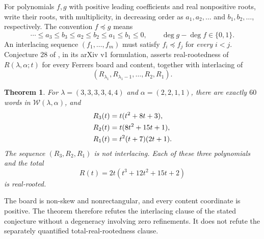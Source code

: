 \documentclass[11pt]{article}
\newtheorem{theorem}{Theorem}
\newcommand{\W}{\mathcal W}
\begin{document}
For polynomials $f,g$ with positive leading coefficients and real
nonpositive roots, write their roots, with multiplicity, in decreasing
order as $a_1,a_2,\ldots$ and $b_1,b_2,\ldots$, respectively.
The convention $f\preceq g$ means
\begin{equation}\label{eq:interlace}
 \cdots\leq a_3\leq b_3\leq a_2\leq b_2\leq a_1\leq b_1\leq0,
 \qquad \deg g-\deg f\in\{0,1\}.
\end{equation}
An interlacing sequence $(f_1,\ldots,f_m)$ must satisfy
$f_i\preceq f_j$ for \emph{every} $i<j$.
Conjecture 28 of \cite{AJQ2025}, in its arXiv v1 formulation, asserts
real-rootedness of $R(\lambda,\alpha;t)$ for every Ferrers board and content,
together with interlacing of
\begin{equation}\label{eq:conjectured}
 (R_{\lambda_1},R_{\lambda_1-1},\ldots,R_2,R_1).
\end{equation}

\begin{theorem}\label{thm:witness}
For $\lambda=(3,3,3,3,4,4)$ and $\alpha=(2,2,1,1)$, there are exactly
$60$ words in $\W(\lambda,\alpha)$, and
\begin{align}\label{eq:refinements}
 R_3(t)&=t(t^2+8t+3),\notag\\
 R_2(t)&=t(8t^2+15t+1),\\
 R_1(t)&=t^2(t+7)(2t+1).\notag
\end{align}
The sequence $(R_3,R_2,R_1)$ is not interlacing. Each of these three
polynomials and the total
\begin{equation}\label{eq:total}
 R(t)=2t(t^3+12t^2+15t+2)
\end{equation}
is real-rooted.
\end{theorem}

The board is non-skew and nonrectangular, and every content coordinate is
positive. The theorem therefore refutes the interlacing clause of the
stated conjecture without a degeneracy involving zero refinements. It
does not refute the separately quantified total-real-rootedness clause.
\end{document}
